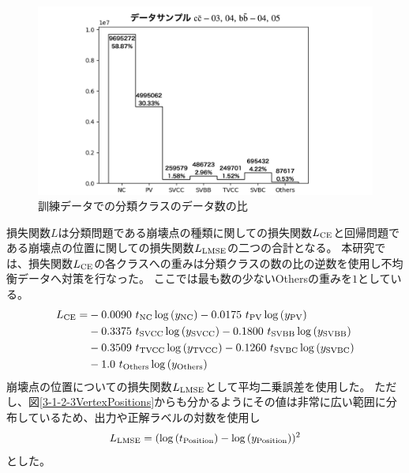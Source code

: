 \begin{figure}[htbp]
 \centering
 \includegraphics[width=1.0\textwidth]{Figure/3Networks/3-3-2-2ImbalancedData.png}
 \caption{訓練データでの分類クラスのデータ数の比}
 \label{3-3-2-2ImbalancedData}
\end{figure}

損失関数$L$は分類問題である崩壊点の種類に関しての損失関数$L_{\rm CE}$と回帰問題である崩壊点の位置に関しての損失関数$L_{\rm LMSE}$の二つの合計となる。
本研究では、損失関数$L_{\rm CE}$の各クラスへの重みは分類クラスの数の比の逆数を使用し不均衡データへ対策を行なった。
ここでは最も数の少ないOthersの重みを$1$としている。
\begin{equation}
 \begin{split}
 L_{\rm CE} = & - 0.0090\  t_{\rm NC} \log{(y_{\rm NC})} - 0.0175\  t_{\rm PV} \log{(y_{\rm PV})} \\
       & - 0.3375\  t_{\rm SVCC} \log{(y_{\rm SVCC})} - 0.1800\  t_{\rm SVBB} \log{(y_{\rm SVBB})}\\
       & - 0.3509\  t_{\rm TVCC} \log{(y_{\rm TVCC})} - 0.1260\  t_{\rm SVBC} \log{(y_{\rm SVBC})}\\
       & - 1.0\  t_{\rm Others} \log{(y_{\rm Others})}\\
 \end{split}
\end{equation}
崩壊点の位置についての損失関数$L_{\rm LMSE}$として平均二乗誤差を使用した。
ただし、図\ref{3-1-2-3VertexPositions}からも分かるようにその値は非常に広い範囲に分布しているため、出力や正解ラベルの対数を使用し
\begin{equation}
 \begin{split}
 L_{\rm LMSE} = (\log{(t_{\rm Position})} - \log{(y_{\rm Position})})^2
 \end{split}
\end{equation}
とした。

